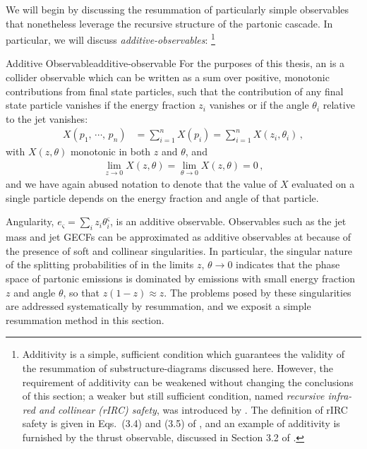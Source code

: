 
We will begin by discussing the resummation of particularly simple observables that nonetheless leverage the recursive structure of the partonic cascade.
%
In particular, we will discuss \emph{\glspl{additive-observable}}:%
\footnote{
    Additivity is a simple, sufficient condition which guarantees the validity of the resummation of \glspl{substructure-diagram} discussed here.
    However, the requirement of additivity can be weakened without changing the conclusions of this section;
    a weaker but still sufficient condition, named \textit{recursive infra-red and collinear (rIRC) safety}, was introduced by .
    The definition of rIRC safety is given in Eqs.\ (3.4) and (3.5) of , and an example of additivity is furnished by the thrust observable, discussed in Section 3.2 of .
}

\begin{definitionbox}{Additive Observable}{additive-observable}
    For the purposes of this thesis, an  is a collider observable which can be written as a sum over positive, monotonic contributions from final state particles, such that the contribution of any final state particle vanishes if the energy fraction \(z_i\) vanishes or if the angle \(\theta_i\) relative to the jet vanishes:
    \begin{align}
        X(p_1,\,\cdots,\,p_n)
        &=
        \sum_{i=1}^n X(p_i)
        =
        \sum_{i=1}^n X(z_i, \theta_i)
        \,,
    \end{align}
    with \(X(z, \theta)\) monotonic in both \(z\) and \(\theta\), and
    \begin{align}
        \lim_{z \to 0} X(z, \theta)
        =
        \lim_{\theta \to 0} X(z, \theta)
        =
        0
        \,,
    \end{align}
    and we have again abused notation to denote that the value of \(X\) evaluated on a single particle depends on the energy fraction and angle of that particle.
\end{definitionbox}

    Angularity, \(e_\varsigma = \sum_i z_i \theta_i^\varsigma\), is an additive observable.
    Observables such as the jet mass and jet GECFs can be approximated as additive observables at  because of the presence of soft and collinear singularities.
    In particular, the singular nature of the splitting probabilities of \Eq{}  in the limits \(z,\,\theta \to 0\) indicates that the phase space of partonic emissions is dominated by emissions with small energy fraction \(z\) and angle \(\theta\), so that \(z(1-z) \approx z\).%
    The problems posed by these singularities are addressed systematically by resummation, and we exposit a simple resummation method in this section.


